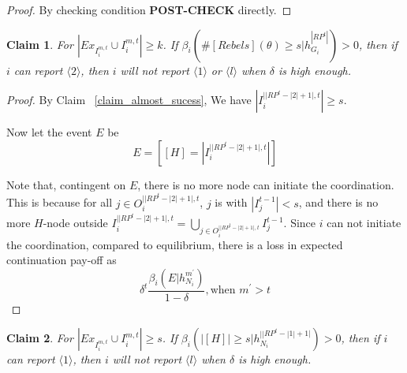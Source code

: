 \documentclass[12pt]{article}
\newtheorem{claim}{Claim}[subsubsection]
\theoremstyle{remark}
\theoremstyle{remark}
\begin{document}
\begin{proof}
By checking condition \textbf{POST-CHECK} directly.
\end{proof}



\begin{claim}
\label{claim_must_report_2}
For $|Ex_{I^{m,t}_i}\cup I^{m,t}_i|\geq k$. If $\beta_{i}(\#[Rebels](\theta)\geq s|h^{|RP^t|}_{G_i})>0$, then if $i$ can report $\langle 2 \rangle$, then $i$ will not report $\langle 1 \rangle$ or $\langle l \rangle$ when $\delta$ is high enough.
\end{claim}

\begin{proof}

By Claim ~\ref{claim_almost_sucess}, We have $|I^{||RP^t-|2|+1|,t}_i|\geq s$.

Now let the event $E$ be
\[E=[[H]=|I^{||RP^t-|2|+1|,t}_i|]\]

Note that, contingent on $E$, there is no more node can initiate the coordination. This is because for all $j\in O^{||RP^t-|2|+1|,t}_i$, $j$ is with $|I^{t-1}_j|< s$, and there is no more $H$-node outside $I^{||RP^t-|2|+1|,t}_i=\bigcup_{j\in O^{||RP^t-|2|+1|,t}_i} I^{t-1}_j$. Since $i$ can not initiate the coordination, compared to equilibrium, there is a loss in expected continuation pay-off as
\[\delta^{t}\frac{\beta_{i}(E|h^{m^{'}}_{N_i})}{1-\delta}, \text{when } m^{'}> t\]





\end{proof}

\begin{claim}
\label{claim_must_report_1}
For $|Ex_{I^{m,t}_i}\cup I^{m,t}_i|\geq s$. If $\beta_{i}(|[H]|\geq s|h^{||RP^t-|1|+1|}_{N_i})>0$, then if $i$ can report $\langle 1 \rangle$, then $i$ will not report $\langle l \rangle$ when $\delta$ is high enough.
\end{claim}
\end{document}

